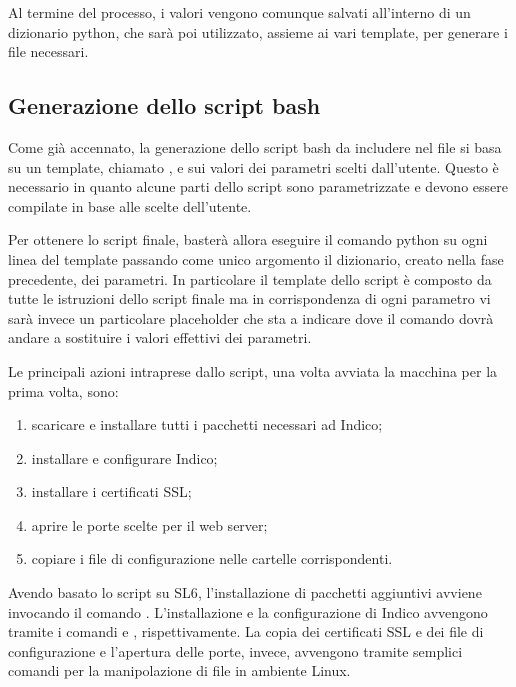             Al termine del processo, i valori vengono comunque salvati all'interno di un dizionario python, che sarà poi utilizzato, assieme ai vari template, per generare i file necessari.
        
        \subsection{Generazione dello script bash} \label{subsec:cd;dci;generazione_script_bash}
        
            Come già accennato, la generazione dello script bash da includere nel file  si basa su un template, chiamato , e sui valori dei parametri scelti dall'utente. Questo è necessario in quanto alcune parti dello script sono parametrizzate e devono essere compilate in base alle scelte dell'utente.
            
            Per ottenere lo script finale, basterà allora eseguire il comando python  su ogni linea del template passando come unico argomento il dizionario, creato nella fase precedente, dei parametri. In particolare il template dello script è composto da tutte le istruzioni dello script finale ma in corrispondenza di ogni parametro vi sarà invece un particolare placeholder che sta a indicare dove il comando  dovrà andare a sostituire i valori effettivi dei parametri.
            
            Le principali azioni intraprese dallo script, una volta avviata la macchina per la prima volta, sono:
            
            \begin{enumerate}
                \item scaricare e installare tutti i pacchetti necessari ad Indico;
                \item installare e configurare Indico;
                \item installare i certificati \ac{SSL};
                \item aprire le porte scelte per il web server;
                \item copiare i file di configurazione nelle cartelle corrispondenti.
            \end{enumerate}
            
            Avendo basato lo script su \ac{SL6}, l'installazione di pacchetti aggiuntivi avviene invocando il comando . L'installazione e la configurazione di Indico avvengono tramite i comandi  e , rispettivamente. La copia dei certificati \ac{SSL} e dei file di configurazione e l'apertura delle porte, invece, avvengono tramite semplici comandi per la manipolazione di file in ambiente Linux.
            
